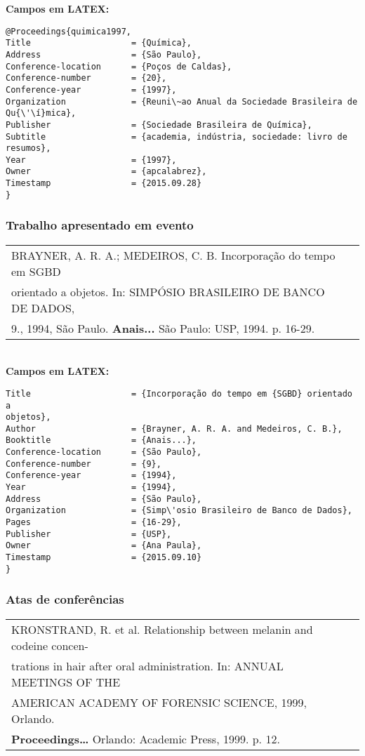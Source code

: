 \textbf{Campos em LATEX:} 

\begin{verbatim}
@Proceedings{quimica1997,
Title                    = {Química},
Address                  = {São Paulo},
Conference-location      = {Poços de Caldas},
Conference-number        = {20},
Conference-year          = {1997},
Organization             = {Reuni\~ao Anual da Sociedade Brasileira de 
Qu{\'\í}mica},
Publisher                = {Sociedade Brasileira de Química},
Subtitle                 = {academia, indústria, sociedade: livro de 
resumos},
Year                     = {1997},
Owner                    = {apcalabrez},
Timestamp                = {2015.09.28}
}
\end{verbatim}
\subsubsection{Trabalho apresentado em evento}

\begin{tabular}{|l|c|} \hline
BRAYNER, A. R. A.; MEDEIROS, C. B. Incorporação do tempo em SGBD \\orientado a objetos. In: SIMPÓSIO BRASILEIRO DE BANCO DE DADOS, \\9., 1994, São Paulo. \textbf{Anais...} São Paulo: USP, 1994. p. 16-29.  \\\hline
\end{tabular} \\

\textbf{Campos em LATEX:} 

\begin{verbatim}
Title                    = {Incorporação do tempo em {SGBD} orientado a 
objetos},
Author                   = {Brayner, A. R. A. and Medeiros, C. B.},
Booktitle                = {Anais...},
Conference-location      = {São Paulo},
Conference-number        = {9},
Conference-year          = {1994},
Year                     = {1994},
Address                  = {São Paulo},
Organization             = {Simp\'osio Brasileiro de Banco de Dados},
Pages                    = {16-29},
Publisher                = {USP},
Owner                    = {Ana Paula},
Timestamp                = {2015.09.10}
}
\end{verbatim}

\subsubsection{Atas de conferências}

\begin{tabular}{|l|c|} \hline
KRONSTRAND, R. et al. Relationship between melanin and codeine
concen-\\trations in hair after oral administration. In: ANNUAL MEETINGS OF THE \\AMERICAN  ACADEMY OF FORENSIC SCIENCE, 1999, Orlando. \\\textbf{Proceedings…} Orlando:  Academic Press, 1999. p. 12.   \\\hline
\end{tabular} \\

